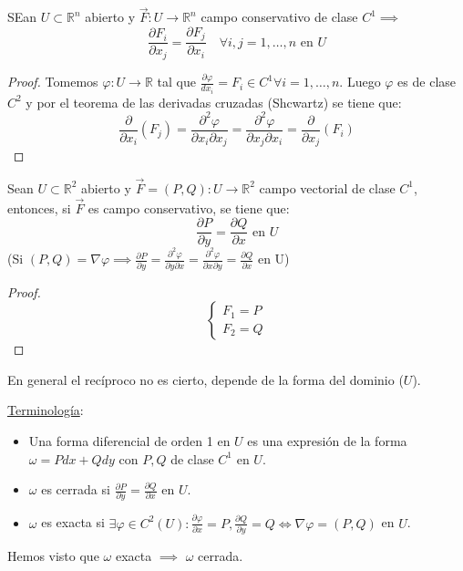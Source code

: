 \begin{proposición}
SEan $U \subset \mathbb{R}^n$ abierto y $\vec{F}: U \to \mathbb{R}^n$ campo conservativo de clase $C^1 \implies$ $$\frac{\partial F_i}{\partial x_j} = \frac{\partial F_j}{\partial x_i} \quad \forall i,j = 1, \ldots, n \text{ en } U$$
\end{proposición}
\begin{proof}
    Tomemos $\varphi: U \to \mathbb{R}$ tal que $\frac{\partial\varphi}{dx_i} = F_i \in C^1 \forall i = 1, \ldots, n$. Luego $\varphi$ es de clase $C^2$ y por el teorema de las derivadas cruzadas (Shcwartz) se tiene que:
    $$\frac{\partial}{\partial x_i}(F_j) = \frac{\partial^2 \varphi}{\partial x_i \partial x_j} = \frac{\partial^2 \varphi}{\partial x_j \partial x_i} = \frac{\partial}{\partial x_j}(F_i)$$
\end{proof}
\begin{corolario}
    Sean $U \subset \mathbb{R}^2$ abierto y $\vec{F} = (P, Q): U \to \mathbb{R}^2$ campo vectorial de clase $C^1$, entonces, si $\vec{F}$ es campo conservativo, se tiene que:
    $$\frac{\partial P}{\partial y} = \frac{\partial Q}{\partial x} \text{ en } U$$
    (Si $(P, Q) = \nabla \varphi \implies \frac{\partial P}{\partial y} = \frac{\partial^2 \varphi}{\partial y \partial x} = \frac{\partial^2 \varphi}{\partial x \partial y} = \frac{\partial Q}{\partial x}$ en U)
\end{corolario}
\begin{proof}
    $$\begin{cases}
            F_1 = P \\ F_2 = Q
        \end{cases}$$
\end{proof}
\begin{observación}
En general el recíproco no es cierto, depende de la forma del dominio ($U$).
\end{observación}
\begin{observación}
\underline{Terminología}:
\begin{itemize}
    \item Una forma diferencial de orden 1 en $U$ es una expresión de la forma $\omega =
              Pdx + Qdy$ con $P, Q$ de clase $C^1$ en $U$.
    \item $\omega$ es cerrada si $\frac{\partial P}{\partial y} = \frac{\partial Q}{\partial x}$ en $U$.
    \item $\omega$ es exacta si $\exists \varphi \in C^2(U) : \frac{\partial\varphi}{\partial x} = P, \frac{\partial Q}{\partial y} = Q \iff \nabla \varphi = (P, Q)$ en $U$.
\end{itemize}
Hemos visto que $\omega$ exacta $\implies$ $\omega$ cerrada.
\end{observación}
